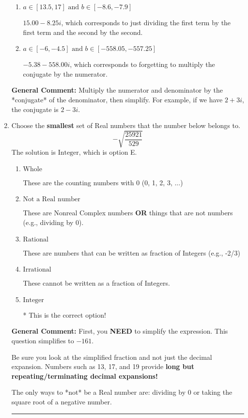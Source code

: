 \documentclass{extbook}[14pt]
\newcommand{\litem}[1]{\item #1

\rule{\textwidth}{0.4pt}}
\begin{document}
\begin{enumerate}
{\begin{enumerate}[label=\Alph*.]
 $9.08  + 2.22 i$, which corresponds to forgetting to multiply the conjugate by the numerator and not computing the conjugate correctly.
\item \( a \in [13.5, 17] \text{ and } b \in [-8.6, -7.9] \)

 $15.00  - 8.25 i$, which corresponds to just dividing the first term by the first term and the second by the second.
\item \( a \in [-6, -4.5] \text{ and } b \in [-558.05, -557.25] \)

 $-5.38  - 558.00 i$, which corresponds to forgetting to multiply the conjugate by the numerator.
\end{enumerate}

\textbf{General Comment:} Multiply the numerator and denominator by the *conjugate* of the denominator, then simplify. For example, if we have $2+3i$, the conjugate is $2-3i$.
}
\litem{
Choose the \textbf{smallest} set of Real numbers that the number below belongs to.
\[ -\sqrt{\frac{25921}{529}} \]The solution is \( \text{Integer} \), which is option E.\begin{enumerate}[label=\Alph*.]
\item \( \text{Whole} \)

These are the counting numbers with 0 (0, 1, 2, 3, ...)
\item \( \text{Not a Real number} \)

These are Nonreal Complex numbers \textbf{OR} things that are not numbers (e.g., dividing by 0).
\item \( \text{Rational} \)

These are numbers that can be written as fraction of Integers (e.g., -2/3)
\item \( \text{Irrational} \)

These cannot be written as a fraction of Integers.
\item \( \text{Integer} \)

* This is the correct option!
\end{enumerate}

\textbf{General Comment:} First, you \textbf{NEED} to simplify the expression. This question simplifies to $-161$. 
 
 Be sure you look at the simplified fraction and not just the decimal expansion. Numbers such as 13, 17, and 19 provide \textbf{long but repeating/terminating decimal expansions!} 
 
 The only ways to *not* be a Real number are: dividing by 0 or taking the square root of a negative number. 
 
}
\end{enumerate}
\end{document}
